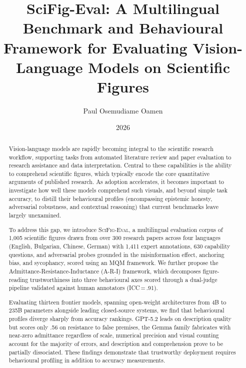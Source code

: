 \documentclass[MSc]{abdnthesis}
\title{SciFig-Eval: A Multilingual Benchmark and
       Behavioural Framework for Evaluating Vision-Language
       Models on Scientific Figures}
\author{Paul Osemudiame Oamen}
\date{2026}
\begin{document}

\maketitle
\makedeclaration


\begin{abstract}
  Vision-language models are rapidly becoming integral to the scientific
  research workflow, supporting tasks from automated literature review
  and paper evaluation to research assistance and data interpretation.
  Central to these capabilities is the ability to comprehend scientific
  figures, which typically encode the core quantitative arguments of
  published research. As adoption accelerates, it becomes important to
  investigate how well these models comprehend such visuals, and beyond
  simple task accuracy, to distill their behavioural profiles
  (encompassing epistemic honesty, adversarial robustness, and contextual
  reasoning) that current benchmarks leave largely unexamined.

  To address this gap, we introduce \textsc{SciFig-Eval}, a multilingual
  evaluation corpus of 1{,}005 scientific figures drawn from over 300
  research papers across four languages (English, Bulgarian, Chinese,
  German) with 1{,}411 expert annotations, 630 capability questions, and
  adversarial probes grounded in the misinformation effect, anchoring
  bias, and sycophancy, scored using an MQM framework. We further propose
  the Admittance-Resistance-Inductance (A-R-I) framework, which
  decomposes figure-reading trustworthiness into three behavioural axes
  scored through a dual-judge pipeline validated against human annotators
  (ICC\,=\,.91).

  Evaluating thirteen frontier models, spanning open-weight architectures
  from 4B to 235B parameters alongside leading closed-source systems, we
  find that behavioural profiles diverge sharply from accuracy rankings.
  GPT-5.2 leads on description quality but scores only .56 on resistance
  to false premises, the Gemma family fabricates with near-zero admittance
  regardless of scale, numerical precision and visual counting account for
  the majority of errors, and description and comprehension prove to be
  partially dissociated. These findings demonstrate that trustworthy deployment requires
  behavioural profiling in addition to accuracy measurements.
\end{abstract}
\end{document}

